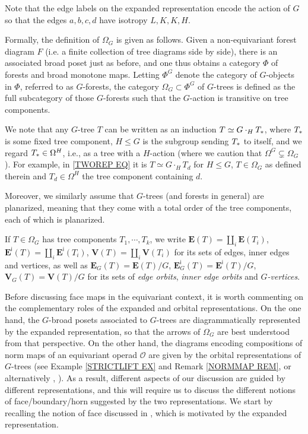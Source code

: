 \documentclass[a4paper,10pt
,draft
]{article}%
\begin{document}
Note that the edge labels on the expanded representation encode the action of $G$ so that the edges 
$a,b,c,d$ have isotropy $L,K,K,H$.

Formally, the definition of $\Omega_G$ \cite[Def. 5.44]{Per18} is given as follows.
Given a non-equivariant forest diagram $F$ 
(i.e. a finite collection of tree diagrams side by side),
there is
an associated broad poset just as before, and one thus obtains a category $\Phi$ of forests and broad monotone maps.
Letting $\Phi^G$ denote the category of $G$-objects in $\Phi$, referred to as $G$-forests,
the category $\Omega_G \subset \Phi^G$ of $G$-trees
is defined as the full subcategory of those $G$-forests such that the $G$-action is transitive on tree components.

We note that any $G$-tree $T$ can be written as
an induction $T \simeq G \cdot_H T_{\**}$, where $T_{\**}$ is some fixed tree component, $H\leq G$ is the subgroup sending $T_{\**}$ to itself,
and we regard $T_{\**} \in \Omega^H$, i.e., as a tree with a $H$-action (where we caution that $\Omega^G \subsetneq \Omega_G$).
For example, in \eqref{TWOREP EQ} it is 
$T \simeq G \cdot_H T_d$ for $H\leq G$, $T \in \Omega_G$ as defined therein and
$T_d \in \Omega^H$ the tree component containing $d$. 

Moreover, we similarly assume that $G$-trees (and forests in general) are planarized, meaning that they come with a total order of the tree components, each of which is  planarized.

If $T\in \Omega_G$ has tree components $T_1,\cdots, T_k$, we write
$\boldsymbol{E}(T) = \amalg_i \boldsymbol{E}(T_i)$, 
$\boldsymbol{E}^{\mathsf{i}}(T) = 
\amalg_i \boldsymbol{E}^{\mathsf{i}}(T_i)$,
$\boldsymbol{V}(T) = \amalg_i \boldsymbol{V}(T_i)$
for its sets of edges, inner edges and vertices, as well as
$\boldsymbol{E}_G(T) = \boldsymbol{E}(T)/G$,
$\boldsymbol{E}^{\mathsf{i}}_G(T) = \boldsymbol{E}^{\mathsf{i}}(T)/G$,
$\boldsymbol{V}_G(T) = \boldsymbol{V}(T)/G$ for its sets of 
\textit{edge orbits},
\textit{inner edge orbits} and
\textit{$G$-vertices}.

Before discussing face maps in the equivariant context, it is worth commenting on the complementary roles of the expanded and orbital representations.
On the one hand, the $G$-broad posets associated to $G$-trees are diagrammatically represented by the expanded representation,
so that the arrows of $\Omega_{G}$ are best understood from that perspective.
On the other hand, the diagrams encoding compositions of norm maps of an equivariant operad $\mathcal{O}$
are given by the orbital representations of  
$G$-trees (see Example \ref{STRICTLIFT EX} and Remark \ref{NORMMAP REM}, or alternatively 
\cite[Ex. 4.9]{Per18}, \cite[(1.10)]{BP17}).
As a result, different aspects of our discussion are guided by different representations, and this will require us to discuss the different notions of face/boundary/horn suggested by the two representations.
We start by recalling the notion of face discussed in \cite{Per18}, which is motivated by the expanded representation.
\end{document}
